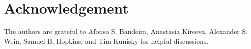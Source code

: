 \section{Acknowledgement}
The authors are grateful to  Afonso S. Bandeira, Anastasia Kireeva, Alexander S. Wein, Samuel B. Hopkins, and Tim Kunisky for helpful discussions. 

